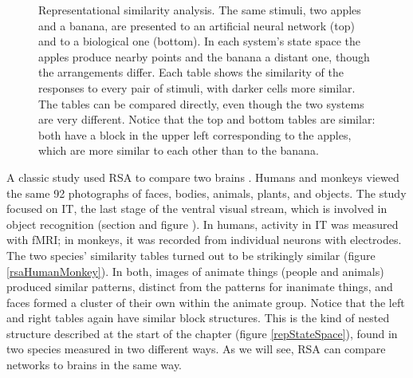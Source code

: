 \begin{figure}[htbp]
\centering
{}
\caption[Jeff Yoshimi.]{Representational similarity analysis. The same stimuli, two apples and a banana, are presented to an artificial neural network (top) and to a biological one (bottom). In each system's state space the apples produce nearby points and the banana a distant one, though the arrangements differ. Each table shows the similarity of the responses to every pair of stimuli, with darker cells more similar. The tables can be compared directly, even though the two systems are very different. Notice that the top and bottom tables are similar: both have a block in the upper left corresponding to the apples, which are more similar to each other than to the banana.}
\label{rsaComparison}
\end{figure}

A classic study used RSA to compare two brains \cite{kriegeskorte2008matching}. Humans and monkeys viewed the same 92 photographs of faces, bodies, animals, plants, and objects. The study focused on IT, the last stage of the ventral visual stream, which is involved in object recognition (section  and figure ). In humans, activity in IT was measured with fMRI; in monkeys, it was recorded from individual neurons with electrodes. The two species' similarity tables turned out to be strikingly similar (figure \ref{rsaHumanMonkey}). In both, images of animate things (people and animals) produced similar patterns, distinct from the patterns for inanimate things, and faces formed a cluster of their own within the animate group. Notice that the left and right tables again have similar block structures. This is the kind of nested structure described at the start of the chapter (figure \ref{repStateSpace}), found in two species measured in two different ways. As we will see, RSA can compare networks to brains in the same way.

